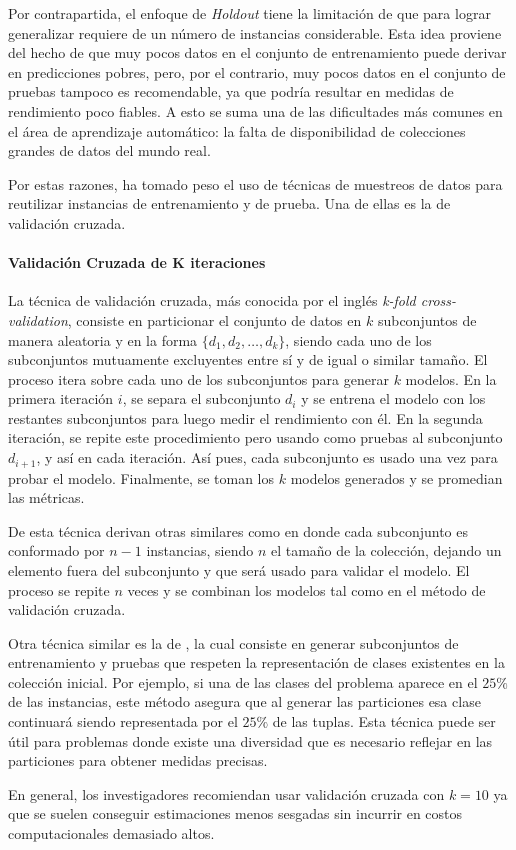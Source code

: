 Por contrapartida, el enfoque de \textit{Holdout} tiene la limitación de que
para lograr generalizar requiere de un número de instancias considerable.
 Esta idea proviene del hecho de que muy pocos datos en el
conjunto de entrenamiento puede derivar en predicciones pobres, pero, por el
contrario, muy pocos datos en el conjunto de pruebas tampoco es recomendable, ya
que podría resultar en medidas de rendimiento poco fiables. A esto se suma una
de las dificultades más comunes en el área de aprendizaje automático: la falta
de disponibilidad de colecciones grandes de datos del mundo real.

Por estas razones, ha tomado peso el uso de técnicas de muestreos de datos para
reutilizar instancias de entrenamiento y de prueba. Una de ellas es la de
validación cruzada.

\paragraph{Validación Cruzada de K iteraciones}

La técnica de validación cruzada, más conocida por el inglés \textit{k-fold
	cross-validation}, consiste en particionar el conjunto de datos en $k$
subconjuntos de manera aleatoria y en la forma $\{d_{1}, d_{2},  \dots, d_{k}
	\}$, siendo cada uno de los subconjuntos mutuamente excluyentes entre sí y de
igual o similar tamaño. El proceso itera sobre cada uno de los subconjuntos para
generar $k$ modelos. En la primera iteración $i$, se separa el subconjunto
$d_{i}$ y se entrena el modelo con los restantes subconjuntos para luego medir
el rendimiento con él. En la segunda iteración, se repite este procedimiento
pero usando como pruebas al subconjunto $d_{i+1}$, y así en cada iteración. Así
pues, cada subconjunto es usado una vez para probar el modelo. Finalmente, se
toman los $k$ modelos generados y se promedian las métricas.

De esta técnica derivan otras similares como 
en donde cada subconjunto es conformado por $n-1$ instancias, siendo $n$ el
tamaño de la colección, dejando un elemento fuera del subconjunto y que será
usado para validar el modelo. El proceso se repite $n$ veces y se combinan los
modelos tal como en el método de validación cruzada.

Otra técnica similar es la de , la
cual consiste en generar subconjuntos de entrenamiento y pruebas que respeten la
representación de clases existentes en la colección inicial. Por ejemplo, si una
de las clases del problema aparece en el $25\%$ de las instancias, este método
asegura que al generar las particiones esa clase continuará siendo representada
por el $25\%$ de las tuplas. Esta técnica puede ser útil para problemas donde
existe una diversidad que es necesario reflejar en las particiones para obtener
medidas precisas.

En general, los investigadores recomiendan usar validación cruzada con $k=10$ ya
que se suelen conseguir estimaciones menos sesgadas sin incurrir en costos
computacionales demasiado altos.

